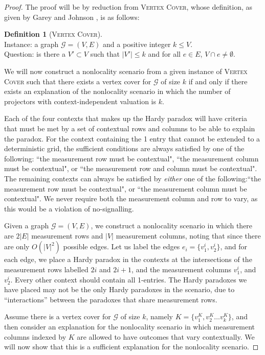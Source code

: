 \documentclass{amsart}
\theoremstyle{definition}
\newtheorem{defn}{Definition}
\begin{document}
\begin{proof}
The proof will be by reduction from \textsc{Vertex Cover}, whose definition, as given by Garey and Johnson \cite{Gare1979}, is as follows:
\begin{defn}[\textsc{Vertex Cover}]
\quad\\
Instance: a graph $\mathcal{G}=(V,E)$ and a positive integer $k\leq V$.\\
Question: is there a $V'\subset V$ such that $\left|V'\right|\leq k$ and for all $e\in E$, $V\cap e\neq\emptyset$.
\end{defn}

We will now construct a nonlocality scenario from a given instance of \textsc{Vertex Cover} such that there exists a vertex cover for $\mathcal{G}$ of size $k$ if and only if there exists an explanation of the nonlocality scenario in which the number of projectors with context-independent valuation is $k$. %

 Each of the four contexts that makes up the Hardy paradox will have criteria that must be met by a set of contextual rows and columns to be able to explain the paradox. For the context containing the 1 entry that cannot be extended to a deterministic grid, the sufficient conditions are always satisfied by one of the following: ``the measurement row must be contextual", ``the measurement column must be contextual", or ``the measurement row and column must be contextual". The remaining contexts can always be satisfied by \emph{either} one of the following:``the measurement row must be contextual", or ``the measurement column must be contextual". We never require both the measurement column and row to vary, as this would be a violation of no-signalling.

Given a graph $\mathcal{G}=(V,E)$, we construct a nonlocality scenario in which there are $2\left|E\right|$ measurement rows and $\left|V\right|$ measurement columns, noting that since there are only $O(\left|V\right|^2)$ possible edges. Let us label the edges $e_i=\{v^i_1,v^i_2\}$, and for each edge, we place a Hardy paradox in the contexts at the intersections of the measurement rows labelled $2i$ and $2i+1$, and the measurement columns $v^i_1$, and $v^i_2$. Every other context should contain all 1-entries. The Hardy paradoxes we have placed may not be the only Hardy paradoxes in the scenario, due to ``interactions'' between the paradoxes that share measurement rows. %

Assume there is a vertex cover for $\mathcal{G}$ of size $k$, namely $K=\{v^K_1,v^K_2\dots v^K_k\}$, and then consider an explanation for the nonlocality scenario in which measurement columns indexed by $K$ are allowed to have outcomes that vary contextually. We will now show that this is a sufficient explanation for the nonlocality scenario.


\end{proof}
\end{document}
